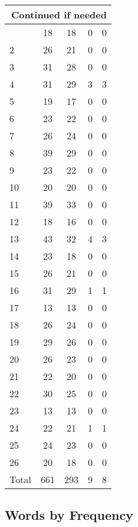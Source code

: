 \begin{center}
\begin{longtable}{l|c|c|c|c}
\hline \multicolumn{5}{|r|}{{Continued if needed}} \\ \hline
\endfoot 
1 & 18 & 18 & 0 & 0\\ \hline
2 & 26 & 21 & 0 & 0\\ \hline
3 & 31 & 28 & 0 & 0\\ \hline
4 & 31 & 29 & 3 & 3\\ \hline
5 & 19 & 17 & 0 & 0\\ \hline
6 & 23 & 22 & 0 & 0\\ \hline
7 & 26 & 24 & 0 & 0\\ \hline
8 & 39 & 29 & 0 & 0\\ \hline
9 & 23 & 22 & 0 & 0\\ \hline
10 & 20 & 20 & 0 & 0\\ \hline
11 & 39 & 33 & 0 & 0\\ \hline
12 & 18 & 16 & 0 & 0\\ \hline
13 & 43 & 32 & 4 & 3\\ \hline
14 & 23 & 18 & 0 & 0\\ \hline
15 & 26 & 21 & 0 & 0\\ \hline
16 & 31 & 29 & 1 & 1\\ \hline
17 & 13 & 13 & 0 & 0\\ \hline
18 & 26 & 24 & 0 & 0\\ \hline
19 & 29 & 26 & 0 & 0\\ \hline
20 & 26 & 23 & 0 & 0\\ \hline
21 & 22 & 20 & 0 & 0\\ \hline
22 & 30 & 25 & 0 & 0\\ \hline
23 & 13 & 13 & 0 & 0\\ \hline
24 & 22 & 21 & 1 & 1\\ \hline
25 & 24 & 23 & 0 & 0\\ \hline
26 & 20 & 18 & 0 & 0\\ \hline
\hline \hline
Total & 661 & 293 & 9 & 8



\end{longtable}
\end{center}

 
\subsection{Words by Frequency}

